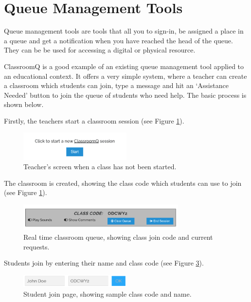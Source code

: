 \newpage
\section{Queue Management Tools}

Queue management tools are tools that all you to sign-in, be assigned a place in a queue and get a notification when you have reached the head of the queue. They can be be used for accessing a digital or physical resource.

ClassroomQ \cite{classroomq} is a good example of an existing queue management tool applied to an educational context. It offers a very simple system, where a teacher can create a classroom which students can join, type a message and hit an `Assistance Needed' button to join the queue of students who need help. The basic process is shown below.

Firstly, the teachers start a classroom session (see Figure \ref{fig:cqstart}).

\FloatBarrier
\begin{figure}[H]
  \centering
  \includegraphics[width=0.5\textwidth]{2context/images/cq1.png}
  \caption{Teacher's screen when a class has not been started.}
  \label{fig:cqstart}
\end{figure}

The classroom is created, showing the class code which students can use to join (see Figure \ref{fig:cqstart}).

\FloatBarrier
\begin{figure}[H]
  \centering
  \includegraphics[width=0.75\textwidth]{2context/images/cq2.png}
  \caption{Real time classroom queue, showing class join code and current requests.}
  \label{fig:cqcode}
\end{figure}

Students join by entering their name and class code (see Figure \ref{fig:cqjoin}).

\FloatBarrier
\begin{figure}[H]
  \centering
  \includegraphics[width=0.5\textwidth]{2context/images/cq3.png}
  \caption{Student join page, showing sample class code and name.}
  \label{fig:cqjoin}
\end{figure}

